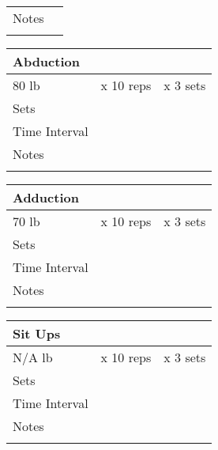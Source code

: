 \documentclass{article}
\begin{document}
\begin{center}
{\begin{tabularx}{\textwidth}{|X|X|X|}
        \hline
        Notes & \multicolumn{2}{c|}{} \\
              & \multicolumn{2}{c|}{} \\
        \hline
    \end{tabularx}}
\vspace{0.25cm}
{\setlength{\extrarowheight}{10pt}%
    \begin{tabularx}{\textwidth}{|X|X|X|}
        \hline
        \multicolumn{3}{|X|}{Abduction} \\
        \hline
        80 lb & x 10 reps & x 3 sets \\
        \hline
        Sets & \multicolumn{2}{|X|}{ } \\
        \hline
        Time Interval & \multicolumn{2}{|X|}{ } \\
        \hline
        Notes & \multicolumn{2}{c|}{} \\
              & \multicolumn{2}{c|}{} \\
        \hline
    \end{tabularx}}
\vspace{0.25cm}
{\setlength{\extrarowheight}{10pt}%
    \begin{tabularx}{\textwidth}{|X|X|X|}
        \hline
        \multicolumn{3}{|X|}{Adduction} \\
        \hline
        70 lb & x 10 reps & x 3 sets \\
        \hline
        Sets & \multicolumn{2}{|X|}{ } \\
        \hline
        Time Interval & \multicolumn{2}{|X|}{ } \\
        \hline
        Notes & \multicolumn{2}{c|}{} \\
              & \multicolumn{2}{c|}{} \\
        \hline
    \end{tabularx}}
\vspace{0.25cm}
{\setlength{\extrarowheight}{10pt}%
    \begin{tabularx}{\textwidth}{|X|X|X|}
        \hline
        \multicolumn{3}{|X|}{Sit Ups} \\
        \hline
        N/A lb & x 10 reps & x 3 sets \\
        \hline
        Sets & \multicolumn{2}{|X|}{ } \\
        \hline
        Time Interval & \multicolumn{2}{|X|}{ } \\
        \hline
        Notes & \multicolumn{2}{c|}{} \\
              & \multicolumn{2}{c|}{} \\

\end{tabularx}}
\end{center}
\end{document}

